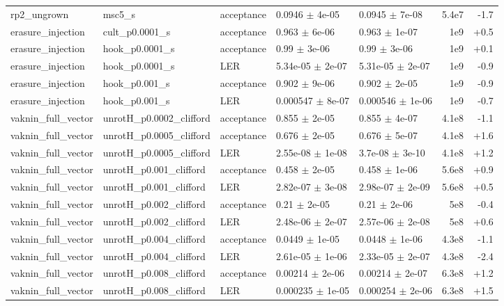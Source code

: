 \documentclass[10pt]{article}
\begin{document}
{\begin{longtable}{l l l l l r r}
rp2\_ungrown & msc5\_s & acceptance & 0.0946 $\pm$ 4e-05 & 0.0945 $\pm$ 7e-08 & 5.4e7 & -1.7 \\
erasure\_injection & cult\_p0.0001\_s & acceptance & 0.963 $\pm$ 6e-06 & 0.963 $\pm$ 1e-07 & 1e9 & +0.5 \\
erasure\_injection & hook\_p0.0001\_s & acceptance & 0.99 $\pm$ 3e-06 & 0.99 $\pm$ 3e-06 & 1e9 & +0.1 \\
erasure\_injection & hook\_p0.0001\_s & LER & 5.34e-05 $\pm$ 2e-07 & 5.31e-05 $\pm$ 2e-07 & 1e9 & -0.9 \\
erasure\_injection & hook\_p0.001\_s & acceptance & 0.902 $\pm$ 9e-06 & 0.902 $\pm$ 2e-05 & 1e9 & -0.9 \\
erasure\_injection & hook\_p0.001\_s & LER & 0.000547 $\pm$ 8e-07 & 0.000546 $\pm$ 1e-06 & 1e9 & -0.7 \\
vaknin\_full\_vector & unrotH\_p0.0002\_clifford & acceptance & 0.855 $\pm$ 2e-05 & 0.855 $\pm$ 4e-07 & 4.1e8 & -1.1 \\
vaknin\_full\_vector & unrotH\_p0.0005\_clifford & acceptance & 0.676 $\pm$ 2e-05 & 0.676 $\pm$ 5e-07 & 4.1e8 & +1.6 \\
vaknin\_full\_vector & unrotH\_p0.0005\_clifford & LER & 2.55e-08 $\pm$ 1e-08 & 3.7e-08 $\pm$ 3e-10 & 4.1e8 & +1.2 \\
vaknin\_full\_vector & unrotH\_p0.001\_clifford & acceptance & 0.458 $\pm$ 2e-05 & 0.458 $\pm$ 1e-06 & 5.6e8 & +0.9 \\
vaknin\_full\_vector & unrotH\_p0.001\_clifford & LER & 2.82e-07 $\pm$ 3e-08 & 2.98e-07 $\pm$ 2e-09 & 5.6e8 & +0.5 \\
vaknin\_full\_vector & unrotH\_p0.002\_clifford & acceptance & 0.21 $\pm$ 2e-05 & 0.21 $\pm$ 2e-06 & 5e8 & -0.4 \\
vaknin\_full\_vector & unrotH\_p0.002\_clifford & LER & 2.48e-06 $\pm$ 2e-07 & 2.57e-06 $\pm$ 2e-08 & 5e8 & +0.6 \\
vaknin\_full\_vector & unrotH\_p0.004\_clifford & acceptance & 0.0449 $\pm$ 1e-05 & 0.0448 $\pm$ 1e-06 & 4.3e8 & -1.1 \\
vaknin\_full\_vector & unrotH\_p0.004\_clifford & LER & 2.61e-05 $\pm$ 1e-06 & 2.33e-05 $\pm$ 2e-07 & 4.3e8 & -2.4 \\
vaknin\_full\_vector & unrotH\_p0.008\_clifford & acceptance & 0.00214 $\pm$ 2e-06 & 0.00214 $\pm$ 2e-07 & 6.3e8 & +1.2 \\
vaknin\_full\_vector & unrotH\_p0.008\_clifford & LER & 0.000235 $\pm$ 1e-05 & 0.000254 $\pm$ 2e-06 & 6.3e8 & +1.5 \\
\bottomrule
\end{longtable}}
\clearpage
\end{document}
